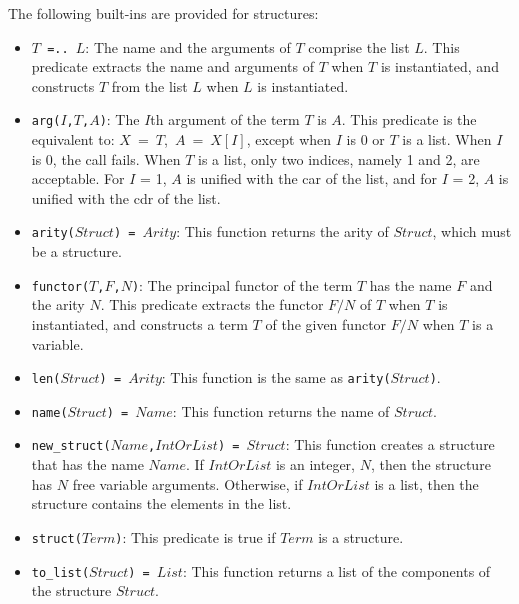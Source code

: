 The following built-ins are provided for structures:
\begin{itemize}
\item \texttt{$T$\ =..\ $L$}: The name and the arguments of $T$ comprise the list $L$. This predicate extracts the name and arguments of $T$ when $T$ is instantiated, and constructs $T$ from the list $L$ when $L$ is instantiated.

\item \texttt{arg($I$,$T$,$A$)}: The $I$th argument of the term $T$ is $A$. This predicate is the equivalent to: $X$\ =\ $T$,\ $A$\ =\ $X[I]$, except when $I$ is 0 or $T$ is a list. When $I$ is 0, the call fails. When $T$ is a list, only two indices, namely 1 and 2, are acceptable. For $I$ = 1, $A$ is unified with the car of the list, and for $I$ = 2, $A$ is unified with the cdr of the list.
\item \texttt{arity($Struct$) = $Arity$}: This function returns the arity of $Struct$, which must be a structure.

\item \texttt{functor($T$,$F$,$N$)}: The principal functor of the term $T$ has the name $F$ and the arity $N$. This predicate extracts the functor $F/N$ of $T$ when $T$ is instantiated, and constructs a term $T$ of the given functor $F/N$ when $T$ is a variable.

\item \texttt{len($Struct$) = $Arity$}: This function is the same as \texttt{arity($Struct$)}.
\item \texttt{name($Struct$) = $Name$}: This function returns the name of $Struct$.
\item \texttt{new\_struct($Name$,$IntOrList$) = $Struct$}: This function creates a structure that has the name $Name$.  If $IntOrList$ is an integer, $N$, then the structure has $N$ free variable arguments.  Otherwise, if $IntOrList$ is a list, then the structure contains the elements in the list.  
\item \texttt{struct($Term$)}: This predicate is true if $Term$ is a structure.
\item \texttt{to\_list($Struct$) = $List$}: This function returns a list of the components of the structure $Struct$.
\end{itemize}

